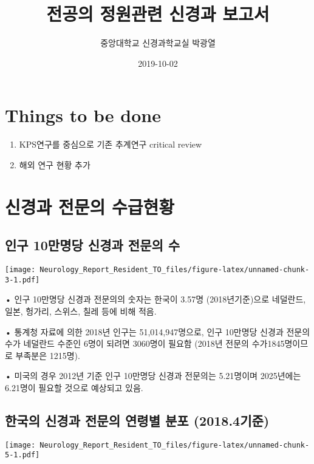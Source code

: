\documentclass[]{book}
\title{전공의 정원관련 신경과 보고서}
\author{중앙대학교 신경과학교실 박광열}
\date{2019-10-02}
\providecommand{\tightlist}{%
  \setlength{\itemsep}{0pt}\setlength{\parskip}{0pt}}
\begin{document}
\maketitle

{
\setcounter{tocdepth}{1}
\tableofcontents
}
\hypertarget{things-to-be-done}{%
\chapter*{Things to be done}\label{things-to-be-done}}

\begin{enumerate}
\def\labelenumi{\arabic{enumi}.}
\tightlist
\item
  KPS연구를 중심으로 기존 추계연구 critical review
\item
  해외 연구 현황 추가
\end{enumerate}

\hypertarget{DemandSupplyNeurologist}{%
\chapter{신경과 전문의 수급현황}\label{DemandSupplyNeurologist}}

\hypertarget{section}{%
\section{인구 10만명당 신경과 전문의 수}\label{section}}

\texttt{[image: Neurology\_Report\_Resident\_TO\_files/figure-latex/unnamed-chunk-3-1.pdf]}

• 인구 10만명당 신경과 전문의의 숫자는 한국이 3.57명 (2018년기준)으로 네덜란드, 일본, 헝가리, 스위스, 칠레 등에 비해 적음.

• 통계청 자료에 의한 2018년 인구는 51,014,947명으로, 인구 10만명당 신경과 전문의 수가 네덜란드 수준인 6명이 되려면 3060명이 필요함 (2018년 전문의 수가1845명이므로 부족분은 1215명).

• 미국의 경우 2012년 기준 인구 10만명당 신경과 전문의는 5.21명이며 2025년에는 6.21명이 필요할 것으로 예상되고 있음.

\hypertarget{section-1}{%
\section{한국의 신경과 전문의 연령별 분포 (2018.4기준)}\label{section-1}}

\texttt{[image: Neurology\_Report\_Resident\_TO\_files/figure-latex/unnamed-chunk-5-1.pdf]}
\end{document}
